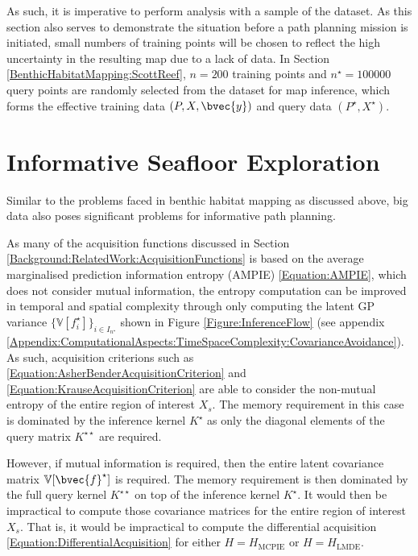 		As such, it is imperative to perform analysis with a sample of the dataset. As this section also serves to demonstrate the situation before a path planning mission is initiated, small numbers of training points will be chosen to reflect the high uncertainty in the resulting map due to a lack of data. In Section \ref{BenthicHabitatMapping:ScottReef}, $n = 200$ training points and $n^{\star} = 100000$ query points are randomly selected from the dataset for map inference, which forms the effective training data $(P, X, \bvec{y})$ and query data $(P^{\star}, X^{\star})$.
		
	\section{Informative Seafloor Exploration}
	\label{Appendix:BigData:InformativeSeafloorExploration}
	
		Similar to the problems faced in benthic habitat mapping as discussed above, big data also poses significant problems for informative path planning.
		
		As many of the acquisition functions discussed in Section \ref{Background:RelatedWork:AcquisitionFunctions} is based on the average marginalised prediction information entropy (AMPIE) \eqref{Equation:AMPIE}, which does not consider mutual information, the entropy computation can be improved in temporal and spatial complexity through only computing the latent GP variance $\{\mathbb{V}[f^{\star}_{i}]\}_{i \in I_{n^{\star}}}$ shown in Figure \ref{Figure:InferenceFlow} (see appendix \ref{Appendix:ComputationalAspects:TimeSpaceComplexity:CovarianceAvoidance}). As such, acquisition criterions such as \eqref{Equation:AsherBenderAcquisitionCriterion} and \eqref{Equation:KrauseAcquisitionCriterion} are able to consider the non-mutual entropy of the entire region of interest $X_{s}$. The memory requirement in this case is dominated by the inference kernel $K^{\star}$ as only the diagonal elements of the query matrix $K^{\star \star}$ are required. 
		
		However, if mutual information is required, then the entire latent covariance matrix $\mathbb{V}[\bvec{f}^{\star}]$ is required. The memory requirement is then dominated by the full query kernel $K^{\star \star}$ on top of the inference kernel $K^{\star}$. It would then be impractical to compute those covariance matrices for the entire region of interest $X_{s}$. That is, it would be impractical to compute the differential acquisition \eqref{Equation:DifferentialAcquisition} for either $H = H_{\mathrm{MCPIE}}$ or $H = H_{\mathrm{LMDE}}$.
		
